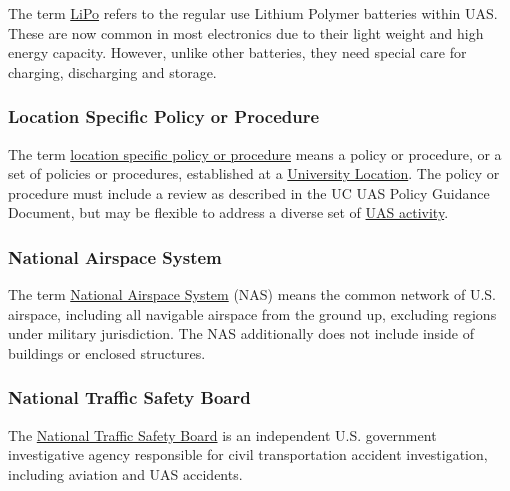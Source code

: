 \documentclass[
]{book}
\begin{document}
The term \protect\hyperlink{LiPo}{LiPo} refers to the regular use Lithium Polymer batteries within UAS. These are now common in most electronics due to their light weight and high energy capacity. However, unlike other batteries, they need special care for charging, discharging and storage.



\hypertarget{LSP}{%
\subsubsection*{Location Specific Policy or Procedure}\label{LSP}}

The term \protect\hyperlink{LSP}{location specific policy or procedure} means a policy or procedure, or a set of policies or procedures, established at a \protect\hyperlink{UL}{University Location}. The policy or procedure must include a review as described in the UC UAS Policy Guidance Document, but may be flexible to address a diverse set of \protect\hyperlink{UASactivity}{UAS activity}.





\hypertarget{NAS}{%
\subsubsection*{National Airspace System}\label{NAS}}

The term \protect\hyperlink{NAS}{National Airspace System} (NAS) means the common network of U.S. airspace, including all navigable airspace from the ground up, excluding regions under military jurisdiction. The NAS additionally does not include inside of buildings or enclosed structures.





\hypertarget{NTSB}{%
\subsubsection*{National Traffic Safety Board}\label{NTSB}}

The \protect\hyperlink{NTSB}{National Traffic Safety Board} is an independent U.S. government investigative agency responsible for civil transportation accident investigation, including aviation and UAS accidents.
\end{document}
